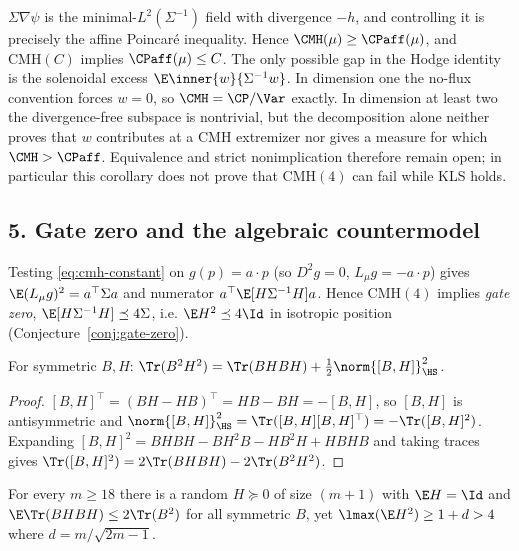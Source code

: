 \documentclass[../main.tex]{subfiles}
\begin{document}
\begin{corollary}
\label{cor:sol-cmh-strictly-stronger}
$\Sigma\nabla\psi$ is the minimal-$L^2(\Sigma^{-1})$ field with divergence $-h$, and controlling
it is precisely the affine Poincar\'e inequality.  Hence
$\CMH(\mu)\ge\CPaff(\mu)$, and $\mathrm{CMH}(C)$ implies $\CPaff(\mu)\le C$.  The only possible
gap in the Hodge identity is the solenoidal excess
$\E\inner{w}{\Sigma^{-1}w}$. In dimension one the no-flux convention forces $w=0$, so
$\CMH=\CP/\Var$ exactly.  In dimension at least two the divergence-free subspace is nontrivial,
but the decomposition alone neither proves that $w$ contributes at a CMH extremizer nor gives a
measure for which $\CMH>\CPaff$.  Equivalence and strict nonimplication therefore remain open;
in particular this corollary does not prove that $\mathrm{CMH}(4)$ can fail while KLS holds.
\end{corollary}

\subsection*{5. Gate zero and the algebraic countermodel}

Testing \eqref{eq:cmh-constant} on $g(p)=a\cdot p$ (so $D^2g=0$, $L_\mu g=-a\cdot p$) gives
$\E(L_\mu g)^2=a^\top\Sigma a$ and numerator $a^\top\E[H\Sigma^{-1}H]a$. Hence
$\mathrm{CMH}(4)$ implies \emph{gate zero}, $\E[H\Sigma^{-1}H]\preceq4\Sigma$, i.e.
$\E H^2\preceq4\Id$ in isotropic position (Conjecture~\ref{conj:gate-zero}).

\begin{lemma}
\label{lem:sol-static-commutator}
For symmetric $B,H$: $\Tr(B^2H^2)=\Tr(BHBH)+\tfrac12\norm{[B,H]}_{\HS}^2$.
\end{lemma}

\begin{proof}
$[B,H]^\top=(BH-HB)^\top=HB-BH=-[B,H]$, so $[B,H]$ is antisymmetric and
$\norm{[B,H]}_{\HS}^2=\Tr([B,H][B,H]^\top)=-\Tr([B,H]^2)$. Expanding
$[B,H]^2=BHBH-BH^2B-HB^2H+HBHB$ and taking traces gives
$\Tr([B,H]^2)=2\Tr(BHBH)-2\Tr(B^2H^2)$.
\end{proof}

\begin{proposition}[= Proposition~\ref{prop:letwin-not-gate-zero}]
\label{prop:sol-countermodel}
For every $m\ge18$ there is a random $H\succeq0$ of size $(m+1)$ with $\E H=\Id$ and
$\E\Tr(BHBH)\le2\Tr(B^2)$ for all symmetric $B$, yet $\lmax(\E H^2)\ge1+d>4$ where
$d=m/\sqrt{2m-1}$.
\end{proposition}
\end{document}
